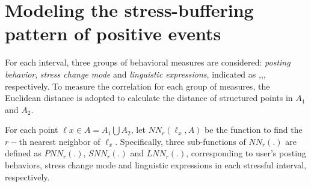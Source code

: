 \section{Modeling the stress-buffering pattern of positive events}
\label{mod:mod1}
For each interval, three groups of behavioral measures are considered: \emph{posting behavior},
\emph{stress change mode} and \emph{linguistic expressions},
indicated as ,,, respectively.
To measure the correlation for each group of measures,
the Euclidean distance is adopted to calculate the distance of structured points in $A_1$ and $A_2$.

For each point $\ell x \in A=A_1\bigcup A_2$,
let $NN_r(\ell_x,A)$ be the function to find the $r-$th nearest neighbor of $\ell_x$.
Specifically, three sub-functions of $NN_r(.)$ are defined as $PNN_r(.)$, $SNN_r(.)$ and $LNN_r(.)$,
corresponding to user's posting behaviors, stress change mode and linguistic expressions in each stressful interval, respectively.

